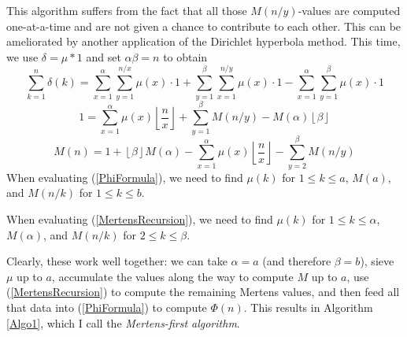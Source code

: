 \documentclass[12pt]{article}
\newcommand{\eqn}[1]{\begin{displaymath} #1 \end{displaymath}}
\newcommand{\neqn}[1]{\begin{equation} #1 \end{equation}}
\newcommand{\floor}[1]{{\left\lfloor #1 \right\rfloor}}
\newcommand{\floordiv}[2]{\floor{\frac{#1}{#2}}}
\begin{document}
This algorithm suffers from the fact that all those $M(n/y)$-values are computed one-at-a-time and are not given a chance to contribute to each other.  This can be ameliorated by another application of the Dirichlet hyperbola method.  This time, we use $\delta = \mu * 1$ and set $\alpha\beta=n$ to obtain
\eqn{\sum_{k=1}^n \delta(k) = \sum_{x=1}^{\alpha}\sum_{y=1}^{n/x} \mu(x) \cdot 1 + \sum_{y=1}^{\beta}\sum_{x=1}^{n/y} \mu(x) \cdot 1 - \sum_{x=1}^{\alpha}\sum_{y=1}^{\beta} \mu(x) \cdot 1}
\eqn{1 = \sum_{x=1}^{\alpha} \mu(x) \floordiv{n}{x} + \sum_{y=1}^{\beta} M(n/y) - M(\alpha) \floor{\beta}}
\neqn{M(n) = 1 + \floor{\beta} M(\alpha) - \sum_{x=1}^{\alpha} \mu(x) \floordiv{n}{x} - \sum_{y=2}^{\beta} M(n/y) \label{MertensRecursion}}
When evaluating (\ref{PhiFormula}), we need to find $\mu(k)$ for $1 \leq k \leq a$, $M(a)$, and $M(n/k)$ for $1 \leq k \leq b$.

When evaluating (\ref{MertensRecursion}), we need to find $\mu(k)$ for $1 \leq k \leq \alpha$, $M(\alpha)$, and $M(n/k)$ for $2 \leq k \leq \beta$.

Clearly, these work well together: we can take $\alpha=a$ (and therefore $\beta=b$), sieve $\mu$ up to $a$, accumulate the values along the way to compute $M$ up to $a$, use (\ref{MertensRecursion}) to compute the remaining Mertens values, and then feed all that data into (\ref{PhiFormula}) to compute $\Phi(n)$.  This results in Algorithm \ref{Algo1}, which I call the \emph{Mertens-first algorithm}.
\end{document}

